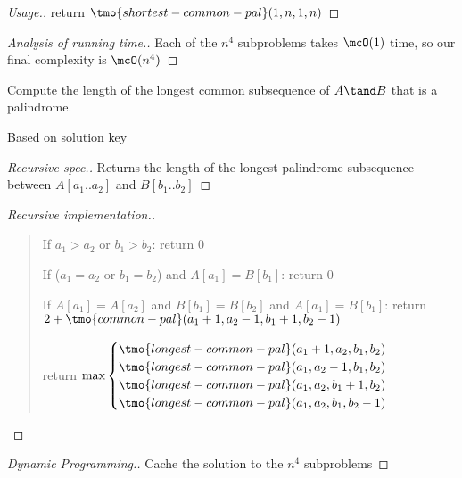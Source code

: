 \documentclass{article}
\begin{document}
\begin{proof}[Usage.]
  return \( \tmo{shortest-common-pal}(1,n,1,n) \)
\end{proof}

\begin{proof}[Analysis of running time.]
  Each of the \( n^4 \) subproblems takes \( \mcO(1) \) time, so our final complexity is \( \mcO(n^4) \)
\end{proof}
\pagebreak

\begin{subexercise} %
  Compute the length of the longest common subsequence of \( A \tand B \) that is a
  palindrome.
\end{subexercise}

\begin{note}
  Based on solution key
\end{note}

\begin{proof}[Recursive spec.]
  Returns the length of the longest palindrome subsequence between \( A[a_1..a_2] \) and \( B[b_1..b_2] \)
\end{proof}

\begin{proof}[Recursive implementation.]\
\begin{quote}
\begin{steps}
  \item If \( a_1 > a_2 \) or \( b_1 > b_2 \): return 0
  \item If (\( a_1 = a_2 \) or \( b_1 = b_2 \)) and \( A[a_1] = B[b_1] \): return 0
  \item If \( A[a_1] = A[a_2] \) and \( B[b_1] = B[b_2] \) and \( A[a_1] = B[b_1] \): return \( 2+\tmo{common-pal}(a_1+1, a_2-1, b_1+1, b_2-1) \)
  \item return $\max\begin{cases}
    \tmo{longest-common-pal}(a_1+1,a_2,b_1,b_2) \\
    \tmo{longest-common-pal}(a_1,a_2-1,b_1,b_2) \\
    \tmo{longest-common-pal}(a_1,a_2,b_1+1,b_2) \\
    \tmo{longest-common-pal}(a_1,a_2,b_1,b_2-1)
  \end{cases}$
\end{steps}
\end{quote}
\end{proof}

\begin{proof}[Dynamic Programming.]
  Cache the solution to the \( n^4 \) subproblems
\end{proof}
\end{document}
